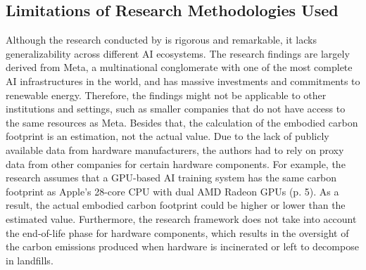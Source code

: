 \documentclass[a4paper, 12pt]{article}
\begin{document}
\subsection{Limitations of Research Methodologies Used}
Although the research conducted by \citet{Wu2022} is rigorous and remarkable, it lacks generalizability across different AI ecosystems. The research findings are largely derived from Meta, a multinational conglomerate with one of the most complete AI infrastructures in the world, and has massive investments and commitments to renewable energy. Therefore, the findings might not be applicable to other institutions and settings, such as smaller companies that do not have access to the same resources as Meta. Besides that, the calculation of the embodied carbon footprint is an estimation, not the actual value. Due to the lack of publicly available data from hardware manufacturers, the authors had to rely on proxy data from other companies for certain hardware components. For example, the research assumes that a GPU-based AI training system has the same carbon footprint as Apple's 28-core CPU with dual AMD Radeon GPUs (p. 5). As a result, the actual embodied carbon footprint could be higher or lower than the estimated value. Furthermore, the research framework does not take into account the end-of-life phase for hardware components, which results in the oversight of the carbon emissions produced when hardware is incinerated or left to decompose in landfills.\hfill \break
\end{document}
